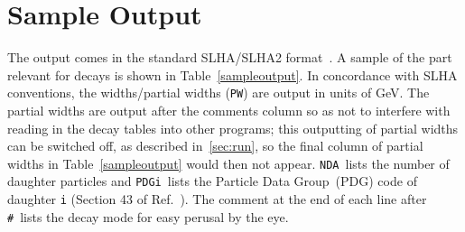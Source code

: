 \documentclass[final,3p,times]{elsarticle}
\def\code#1{{\tt #1}}
\begin{document}
\section{Sample Output} \label{sec:out}
The output comes in the standard SLHA/SLHA2
format~\cite{Skands:2003cj,Allanach:2008qq}. A sample of the part relevant for
decays is shown in Table~\ref{sampleoutput}. In concordance with SLHA conventions, the widths/partial widths
(\code{PW}) are output 
in units 
of GeV. The partial widths are output after the comments column so as not to interfere
with reading in the decay tables into other programs; this outputting of partial widths can be switched off,
as described in~\ref{sec:run}, so the final column of partial widths in Table~\ref{sampleoutput} would then not appear.
\code{NDA}~lists the number of daughter particles and
\code{PDGi}~lists the
Particle Data Group~(PDG) code of daughter \code{i} (Section 43 of
Ref.~\cite{Olive:2016xmw}). 
The comment at the end of each line after \code{\#}~lists the decay
mode for easy perusal by the eye.
\end{document}
